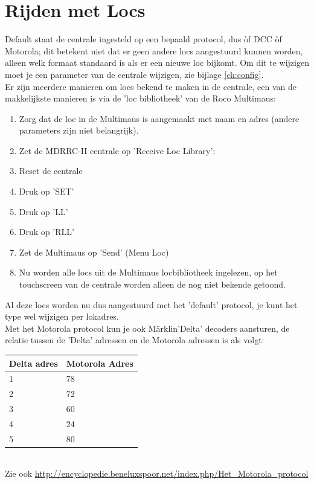 \documentclass[12pt,a4paper]{report}
\newcommand*{\marklin}{M\"{a}rklin}
\begin{document}
\section{Rijden met Locs}
Default staat de centrale ingesteld op een bepaald protocol, dus \`{o}f DCC \`{o}f Motorola; dit betekent niet dat er geen andere locs aangestuurd kunnen worden, alleen welk formaat standaard is als er een nieuwe loc bijkomt. Om dit te wijzigen moet je een parameter van de centrale wijzigen, zie bijlage \ref{ch:config}.\\
Er zijn meerdere manieren om locs bekend te maken in de centrale, een van de makkelijkste manieren is via de 'loc bibliotheek' van de Roco Multimaus:
\begin{enumerate}
\item Zorg dat de loc in de Multimaus is aangemaakt met naam en adres (andere parameters zijn niet belangrijk).
\item Zet de MDRRC-II centrale op 'Receive Loc Library': 
\item Reset de centrale
\item Druk op 'SET'
\item Druk op 'LL'
\item Druk op 'RLL'
\item Zet de Multimaus op 'Send' (Menu Loc)
\item Nu worden alle locs uit de Multimaus locbibliotheek ingelezen, op het touchscreen van de centrale worden alleen de nog niet bekende getoond.
\end{enumerate}

Al deze locs worden nu dus aangestuurd met het 'default' protocol, je kunt het type wel wijzigen per lokadres.\\
Met het Motorola protocol kun je ook \marklin 'Delta' decoders aansturen, de relatie tussen de 'Delta' adressen en de Motorola adressen is als volgt:\\

\begin{tabular}{|l|l|}
\hline
Delta adres&Motorola Adres\\
\hline
1&78\\
\hline
2&72\\
\hline
3&60\\
\hline
4&24\\
\hline
5&80\\
\hline
\end{tabular}\\

Zie ook \url{http://encyclopedie.beneluxspoor.net/index.php/Het_Motorola_protocol}
\end{document}
